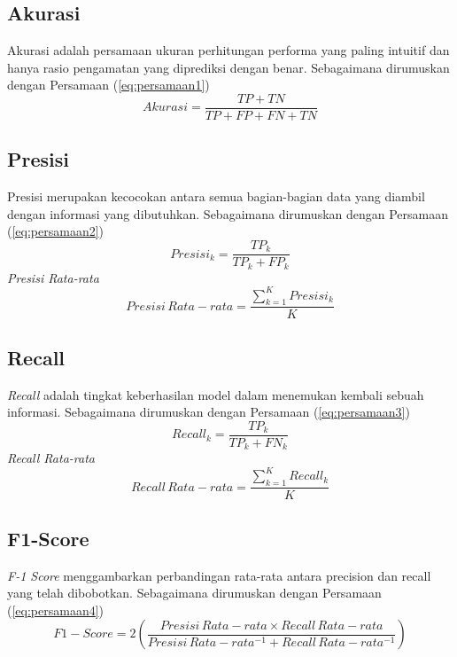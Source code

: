 \subsection{Akurasi}
Akurasi adalah persamaan ukuran perhitungan performa yang paling intuitif dan hanya rasio pengamatan yang diprediksi dengan benar. Sebagaimana dirumuskan dengan Persamaan (\ref{eq:persamaan1})
\begin{equation}\label{eq:persamaan1}
Akurasi=\frac{TP+TN}{TP+FP+FN+TN}
\end{equation}
\subsection{Presisi}
Presisi merupakan kecocokan antara semua bagian-bagian data yang diambil dengan informasi yang dibutuhkan. Sebagaimana dirumuskan dengan Persamaan (\ref{eq:persamaan2})
\begin{equation}\label{eq:persamaan2}
Presisi_k=\frac{TP_k}{TP_k+FP_k}
\end{equation} 
{\it Presisi Rata-rata}
\begin{equation}\label{eq:persamaan3}
Presisi \, Rata-rata=\frac{\sum_{k=1}^K Presisi_k}{K}
\end{equation} 
\subsection{Recall}
\textit{Recall} adalah tingkat keberhasilan model dalam menemukan
kembali sebuah informasi. Sebagaimana dirumuskan dengan Persamaan (\ref{eq:persamaan3})
\begin{equation}\label{eq:persamaan4}
Recall_k=\frac{TP_k}{TP_k+FN_k}
\end{equation} 
{\it Recall Rata-rata}
\begin{equation}\label{eq:persamaan5}
Recall \, Rata-rata=\frac{\sum_{k=1}^K Recall_k}{K}
\end{equation} 
\subsection{F1-Score}
\textit{F-1 Score} menggambarkan perbandingan rata-rata antara precision dan recall yang telah dibobotkan. Sebagaimana dirumuskan dengan Persamaan (\ref{eq:persamaan4})
\begin{equation}\label{eq:persamaan6}
F1-Score=2 \left( \frac{Presisi \, Rata-rata \times Recall \, Rata-rata}{Presisi \, Rata-rata^{-1} + Recall \, Rata-rata^{-1}} \right)
\end{equation} 


